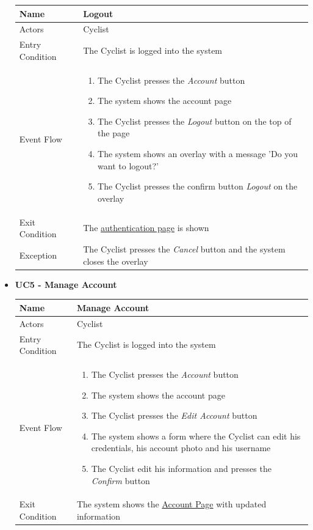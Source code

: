 \begin{itemize}
\begin{tabular}{|p{7cm}|p{7cm}|}
\hline
Name            & Logout \\ \hline
Actors          & Cyclist \\ \hline
Entry Condition & The Cyclist is logged into the system \\ \hline
Event Flow      & 
\begin{enumerate}
    \item The Cyclist presses the \textit{Account} button
    \item The system shows the account page 
    \item The Cyclist presses the \textit{Logout} button on the top of the page
    \item The system shows an overlay with a message 'Do you want to logout?'
    \item The Cyclist presses the confirm button \textit{Logout} on the overlay
\end{enumerate}
\\ \hline
Exit Condition  & The \hyperref[fig:LoginSignUp]{ authentication page} is shown \\ \hline
Exception      & The Cyclist presses the \textit{Cancel} button and the system closes the overlay \\ \hline
\end{tabular}
\newpage
\item \textbf{UC5 - Manage Account}\par\smallskip
\noindent
\begin{tabular}{|p{7cm}|p{7cm}|}
\hline
Name            & Manage Account \\ \hline
Actors          & Cyclist \\ \hline
Entry Condition & The Cyclist is logged into the system \\ \hline
Event Flow      &
\begin{enumerate}
    \item The Cyclist presses the \textit{Account} button
     \item The system shows the account page
    \item The Cyclist presses the  \textit{Edit Account} button
    \item The system shows a form where the Cyclist can edit his credentials, his account photo and his username
    \item The Cyclist edit his information and presses the  \textit{Confirm} button
\end{enumerate}
\\ \hline
Exit Condition  & The system shows the \hyperref[fig:Account]{Account Page}  with updated information \\ \hline

\end{tabular}
\end{itemize}
